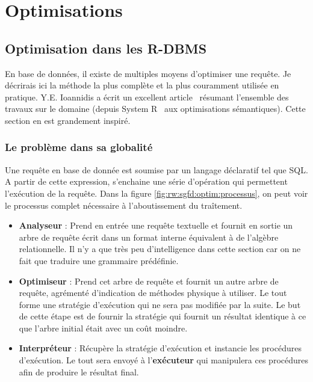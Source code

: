 \section{Optimisations}
\subsection{Optimisation dans les R-DBMS}
En base de données, il existe de multiples moyens d'optimiser une requête. Je décrirais ici la méthode la plus complète et la plus couramment utilisée en pratique. Y.E. Ioannidis a écrit un excellent article~\cite{Ioannidis:optimization} résumant l'ensemble des travaux sur le domaine (depuis System R~\cite{IBM:systemr} aux optimisations sémantiques). Cette section en est grandement inspiré.

\subsubsection{Le problème dans sa globalité}


Une requête en base de donnée est soumise par un langage déclaratif tel que SQL. A partir de cette expression, s'enchaine une série d'opération qui permettent l'exécution de la requête. Dans la figure \ref{fig:rw:sgfd:optim:processus}, on peut voir le processus complet nécessaire à l'aboutissement du traîtement. 
\begin{itemize}
    \item \textbf{Analyseur} : Prend en entrée une requête textuelle et fournit en sortie un arbre de requête écrit dans un format interne équivalent à de l'algèbre relationnelle. Il n'y a que très peu d'intelligence dans cette section car on ne fait que traduire une grammaire prédéfinie.
    \item \textbf{Optimiseur} : Prend cet arbre de requête et fournit un autre arbre de requête, agrémenté d'indication de méthodes physique à utiliser. Le tout forme une stratégie d'exécution qui ne sera pas modifiée par la suite. Le but de cette étape est de fournir la stratégie qui fournit un résultat identique à ce que l'arbre initial était avec un coût moindre.
    \item \textbf{Interpréteur} : Récupère la stratégie d'exécution et instancie les procédures d'exécution. Le tout sera envoyé à l'\textbf{exécuteur} qui manipulera ces procédures afin de produire le résultat final.
\end{itemize}

